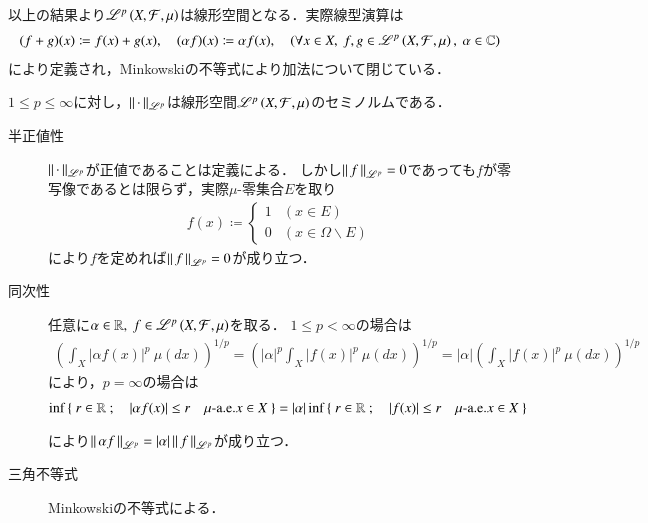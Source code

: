 以上の結果より$\mathscr{L}^{p} \left(X,\mathcal{F},\mu\right)$は線形空間となる．実際線型演算は
\begin{align}
	(f+g)(x) \coloneqq f(x) + g(x), \quad (\alpha f)(x) \coloneqq \alpha f(x), \quad (\forall x \in X,\ f,g \in \semiLp{p}{X,\mathcal{F},\mu},\ \alpha \in \C)
\end{align}
により定義され，Minkowskiの不等式により加法について閉じている．

\begin{itembox}[l]{}
	\begin{lem}
		$1 \leq p \leq \infty$に対し，$\left\|\, \cdot\, \right\|_{\mathscr{L}^p}$は線形空間$\mathscr{L}^{p} \left(X,\mathcal{F},\mu\right)$のセミノルムである．
	\end{lem}
\end{itembox}
\begin{prf}\mbox{}
	\begin{description}
	\item[半正値性] $\left\|\, \cdot\, \right\|_{\mathscr{L}^p}$が正値であることは定義による．
		しかし$\left\|\, f\, \right\|_{\mathscr{L}^p} = 0$であっても$f$が零写像であるとは限らず，実際$\mu$-零集合$E$を取り
		\begin{align}
			f(x) \coloneqq
			\begin{cases}
				1 & (x \in E) \\
				0 & (x \in \Omega \backslash E)
			\end{cases}
		\end{align}
		により$f$を定めれば$\left\|\, f\, \right\|_{\mathscr{L}^p} = 0$が成り立つ．
		
	\item[同次性] 
		任意に$\alpha \in \mathbb{R},\ f \in \mathscr{L}^{p} \left(X,\mathcal{F},\mu\right)$を取る．
		$1 \leq p < \infty$の場合は
		\begin{align}
			\left( \int_{X} |\alpha f(x)|^p\ \mu(dx) \right)^{1/p} = \left( |\alpha|^p \int_{X} |f(x)|^p\ \mu(dx) \right)^{1/p} 
			= |\alpha| \left( \int_{X} |f(x)|^p\ \mu(dx) \right)^{1/p}
		\end{align}
		により，$p = \infty$の場合は
		\begin{align}
			\operatorname*{inf}_{} \left\{\ r \in \mathbb{R}\ ;\quad |\alpha f(x)| \leq r \quad \mbox{$\mu$-a.e.}x \in X\ \right\} = |\alpha|\operatorname*{inf}_{} \left\{\ r \in \mathbb{R}\ ;\quad |f(x)|  \leq r \quad \mbox{$\mu$-a.e.}x \in X\ \right\}
		\end{align}
		により$\left\|\, \alpha f\, \right\|_{\mathscr{L}^p} = |\alpha|\left\|\, f\, \right\|_{\mathscr{L}^p}$が成り立つ．
		
	\item[三角不等式] Minkowskiの不等式による．
	\QED
	\end{description}
\end{prf}

